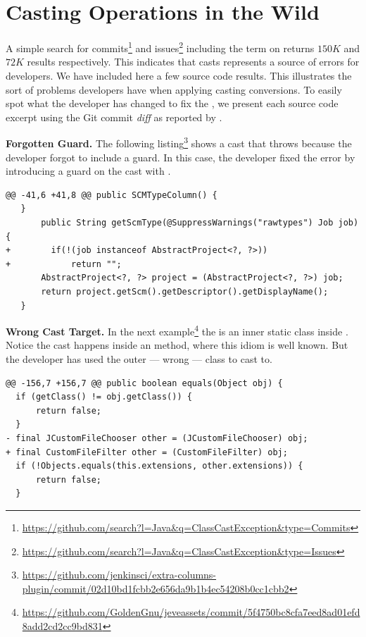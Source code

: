 
\chapter{Casting Operations in the Wild}
\label{cha:casts}

A simple search for
commits\footnote{\url{https://github.com/search?l=Java&q=ClassCastException&type=Commits}}
and
issues\footnote{\url{https://github.com/search?l=Java&q=ClassCastException&type=Issues}}
including the term  on \github{} returns \circa{} $150K$ and $72K$ results respectively.
This indicates that casts represents a source of errors for developers.
We have included here a few source code results.
This illustrates the sort of problems developers have when applying casting conversions.
To easily spot what the developer has changed to fix the ,
we present each source code excerpt using the Git commit \emph{diff} as reported by \github{}.

\textbf{Forgotten Guard.}
The following listing\footnote{\url{https://github.com/jenkinsci/extra-columns-plugin/commit/02d10bd1fcbb2e656da9b1b4ec54208b0cc1cbb2}}
shows a cast that throws  because the developer forgot to include a guard.
In this case, the developer fixed the error by introducing a guard on the cast with .

\begin{lstlisting}[style=java]
@@ -41,6 +41,8 @@ public SCMTypeColumn() {
   }
       public String getScmType(@SuppressWarnings("rawtypes") Job job) {
+        if(!(job instanceof AbstractProject<?, ?>))
+            return "";
       AbstractProject<?, ?> project = (AbstractProject<?, ?>) job;
       return project.getScm().getDescriptor().getDisplayName();
   }
\end{lstlisting}

\textbf{Wrong Cast Target.}
In the next example\footnote{\url{https://github.com/GoldenGnu/jeveassets/commit/5f4750bc8cfa7eed8ad01efd8add2cd2cc9bd831}}
the  is an inner static class inside .
Notice the cast happens inside an  method, where this idiom is well known.
But the developer has used the outer --- wrong --- class to cast to.

\begin{lstlisting}[style=java]
@@ -156,7 +156,7 @@ public boolean equals(Object obj) {
  if (getClass() != obj.getClass()) {
      return false;
  }
- final JCustomFileChooser other = (JCustomFileChooser) obj;
+ final CustomFileFilter other = (CustomFileFilter) obj;
  if (!Objects.equals(this.extensions, other.extensions)) {
      return false;
  }
\end{lstlisting}

